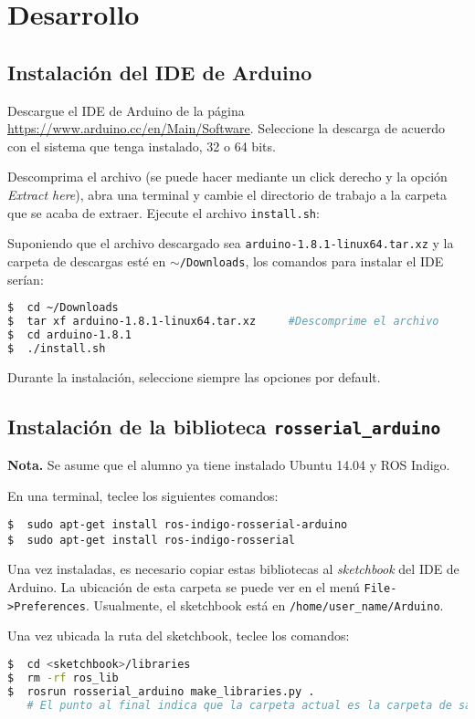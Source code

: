 \documentclass[a4paper,12pt]{article}
\begin{document}
\section{Desarrollo}
\subsection{Instalación del IDE de Arduino}

Descargue el IDE de Arduino de la página \url{https://www.arduino.cc/en/Main/Software}. Seleccione la descarga de acuerdo con el sistema que tenga instalado, 32 o 64 bits. 

Descomprima el archivo (se puede hacer mediante un click derecho y la opción \textit{Extract here}), abra una terminal y cambie el directorio de trabajo a la carpeta que se acaba de extraer. Ejecute el archivo \texttt{install.sh}:

Suponiendo que el archivo descargado sea \texttt{arduino-1.8.1-linux64.tar.xz} y la carpeta de descargas esté en \texttt{$\sim$/Downloads}, los comandos para instalar el IDE serían:
\begin{lstlisting}[language=bash]
$  cd ~/Downloads      
$  tar xf arduino-1.8.1-linux64.tar.xz     #Descomprime el archivo
$  cd arduino-1.8.1
$  ./install.sh
\end{lstlisting}

Durante la instalación, seleccione siempre las opciones por default. 

\subsection{Instalación de la biblioteca \texttt{rosserial\_arduino}}
\textbf{Nota.} Se asume que el alumno ya tiene instalado Ubuntu 14.04 y ROS Indigo. 

En una terminal, teclee los siguientes comandos:
\begin{lstlisting}
$  sudo apt-get install ros-indigo-rosserial-arduino
$  sudo apt-get install ros-indigo-rosserial
\end{lstlisting}

Una vez instaladas, es necesario copiar estas bibliotecas al \textit{sketchbook} del IDE de Arduino. La ubicación de esta carpeta se puede ver en el menú \texttt{File->Preferences}. Usualmente, el sketchbook está en \texttt{/home/user\_name/Arduino}. 

Una vez ubicada la ruta del sketchbook, teclee los comandos:
\begin{lstlisting}[language=bash]
$  cd <sketchbook>/libraries
$  rm -rf ros_lib
$  rosrun rosserial_arduino make_libraries.py .
   # El punto al final indica que la carpeta actual es la carpeta de salida.
\end{lstlisting}
\end{document}
